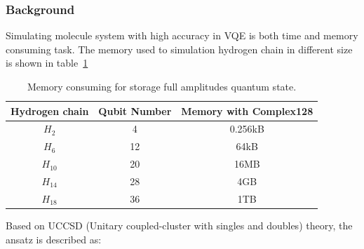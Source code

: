 
\subsubsection{Background}
Simulating molecule system with high accuracy in VQE is both time and memory consuming task. The memory used to simulation hydrogen chain in different size is shown in table~\ref{tab:memory_h_chain}

\begin{table}[ht]
    \begin{tabular}{ccc}
        \toprule
        Hydrogen chain & Qubit Number & Memory with Complex128 \\
        \midrule
        $H_2$          & 4            & 0.256kB                \\
        $H_6$          & 12           & 64kB                   \\
        $H_{10}$       & 20           & 16MB                   \\
        $H_{14}$       & 28           & 4GB                    \\
        $H_{18}$       & 36           & 1TB                    \\
        \bottomrule
    \end{tabular}
    \caption{Memory consuming for storage full amplitudes quantum state.}
    \label{tab:memory_h_chain}
\end{table}

Based on UCCSD (Unitary coupled-cluster with singles and doubles) theory, the ansatz is described as:

